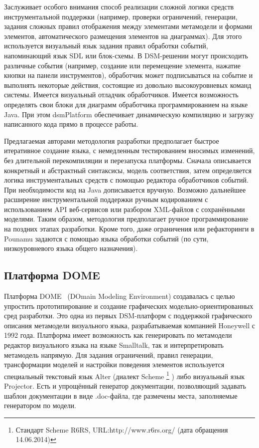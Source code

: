 Заслуживает особого внимания способ реализации сложной логики средств инструментальной 
поддержки (например, проверки ограничений, генерации, задания сложных правил отображения 
между элементами метамодели и формами элементов, автоматического размещения элементов 
на диаграммах). Для этого используется визуальный язык задания правил обработки событий, 
напоминающий язык SDL или блок-схемы. В \ac{DSM}-решении могут происходить различные события 
(например, создание или перемещение элемента, нажатие кнопки на панели инструментов), 
обработчик может подписываться на событие и выполнять некоторые действия, состоящие из 
довольно высокоуровневых команд системы. Имеется визуальный отладчик обработчиков. 
Имеется возможность определять свои блоки для диаграмм обработчика программированием 
на языке Java. При этом \ac{dsmPlatform} обеспечивает динамическую компиляцию и загрузку 
написанного кода прямо в процессе работы.

Предлагаемая авторами методология разработки предполагает быстрое итеративное создание 
языка, с немедленным тестированием вносимых изменений, без длительной перекомпиляции 
и перезапуска платформы. Сначала описывается конкретный и абстрактный синтаксисы, 
модель соответствия, затем определяется логика инструментальных средств с помощью 
редактора обработчиков событий. При необходимости код на Java дописывается вручную. 
Возможно дальнейшее расширение инструментальной поддержки ручным кодированием с использованием 
API веб-сервисов или разбором XML-файлов с сохранёнными моделями. Таким образом, методология 
предполагает ручное программирование на поздних этапах разработки. Кроме того, даже 
ограничения или рефакторинги в Pounamu задаются с помощью языка обработки событий 
(по сути, низкоуровневого языка общего назначения).

\subsection{Платформа DOME}
Платформа DOME~\cite{engstrom2000building, guide1999honeywell} (DOmain Modeling Environment) создавалась с целью упростить
прототипирование и создание графических модельно-ориентированных сред разработки. Это одна из первых
\ac{DSM}-платформ с поддержкой графического описания метамодели визуального языка, разрабатываемая 
компанией Honeywell с 1992 года. Платформа имеет возможность как генерировать по метамодели редактор
визуального языка на языке Smalltalk, так и интерпретировать метамодель напрямую. Для
задания ограничений, правил генерации, трансформации моделей и настройки поведения элементов 
используется специальный текстовый язык Alter (диалект Scheme%
\footnote{Стандарт Scheme R6RS, URL:http://www.r6rs.org/ (дата обращения 14.06.2014)}%
) либо визуальный язык Projector. Есть и упрощённый генератор документации, позволяющий задавать шаблон документации в виде
.doc-файла, где размечены места, заполняемые генератором по модели.

